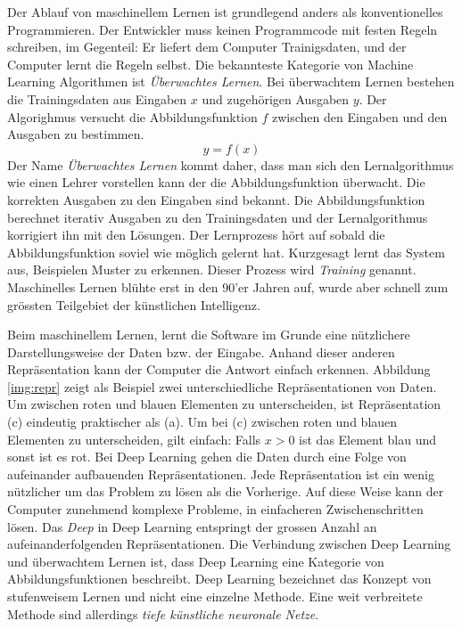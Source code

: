 Der Ablauf von maschinellem Lernen ist grundlegend anders als konventionelles Programmieren. Der Entwickler muss keinen Programmcode mit festen Regeln schreiben, im Gegenteil: Er liefert dem Computer Trainigsdaten, und der Computer lernt die Regeln selbst. Die bekannteste Kategorie von Machine Learning Algorithmen ist \textit{Überwachtes Lernen}. Bei überwachtem Lernen bestehen die Trainingsdaten aus Eingaben $x$ und zugehörigen Ausgaben $y$. Der Algorighmus versucht die Abbildungsfunktion $f$ zwischen den Eingaben und den Ausgaben zu bestimmen. 
$$ y = f(x)$$
Der Name \textit{Überwachtes Lernen} kommt daher, dass man sich den Lernalgorithmus wie einen Lehrer vorstellen kann der die Abbildungsfunktion überwacht. Die korrekten Ausgaben zu den Eingaben sind bekannt. Die Abbildungsfunktion berechnet iterativ Ausgaben zu den Trainingsdaten und der Lernalgorithmus korrigiert ihn mit den Lösungen. Der Lernprozess hört auf sobald die Abbildungsfunktion soviel wie möglich gelernt hat. Kurzgesagt lernt das System aus, Beispielen Muster zu erkennen. Dieser Prozess wird \textit{Training} genannt. Maschinelles Lernen blühte erst in den 90'er Jahren auf, wurde aber schnell zum grössten Teilgebiet der künstlichen Intelligenz. \parencite[vgl. ][Kap. 1.1.2]{chollet} \parencite[vgl. ][]{supervised}

Beim maschinellem Lernen, lernt die Software im Grunde eine nützlichere Darstellungsweise der Daten bzw. der Eingabe. Anhand dieser anderen Repräsentation kann der Computer die Antwort einfach erkennen. Abbildung \ref{img:repr} zeigt als Beispiel  zwei unterschiedliche Repräsentationen von Daten. Um zwischen roten und blauen Elementen zu unterscheiden, ist Repräsentation (c) eindeutig praktischer als (a). Um bei (c) zwischen roten und blauen Elementen zu unterscheiden, gilt einfach: Falls $x>0$ ist das Element blau und sonst ist es rot. Bei Deep Learning gehen die Daten durch eine Folge von aufeinander aufbauenden Repräsentationen. Jede Repräsentation ist ein wenig nützlicher um das Problem zu lösen als die Vorherige.  Auf diese Weise kann der Computer zunehmend komplexe Probleme, in einfacheren Zwischenschritten lösen. Das \textit{Deep} in Deep Learning entspringt der grossen Anzahl an aufeinanderfolgenden Repräsentationen. Die Verbindung zwischen Deep Learning und überwachtem Lernen ist, dass Deep Learning eine Kategorie von Abbildungsfunktionen beschreibt. Deep Learning bezeichnet das Konzept von stufenweisem Lernen und nicht eine einzelne Methode.  Eine weit verbreitete Methode sind allerdings \textit{tiefe künstliche neuronale Netze}. \parencite[vgl.][]{chollet} 

